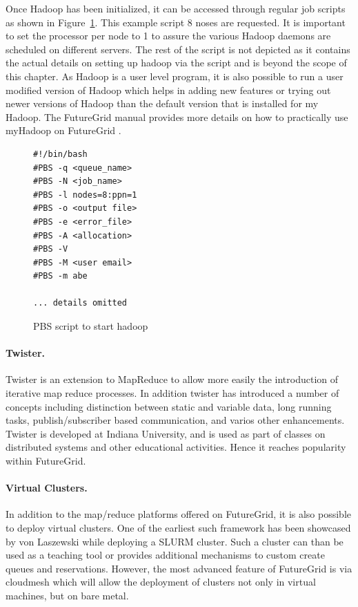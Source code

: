 Once Hadoop has been initialized, it can be accessed through regular
job scripts as shown in Figure~\ref{F:myhadoop-script}. This example
script 8 noses are requested. It is important to set the processor per
node to 1 to assure the various Hadoop daemons are scheduled on
different servers. The rest of the script is not depicted as it
contains the actual details on setting up hadoop via the script and is
beyond the scope of this chapter. As Hadoop is a user level program, it is also
possible to run a user modified version of Hadoop which helps in
adding new features or trying out newer versions of Hadoop than the
default version that is installed for my Hadoop. The FutureGrid manual
provides more details on how to practically use myHadoop on FutureGrid
\cite{fg-manual-hadoop}.

\begin{figure}[htb]
\begin{center}
\begin{verbatim}
#!/bin/bash
#PBS -q <queue_name>
#PBS -N <job_name>
#PBS -l nodes=8:ppn=1
#PBS -o <output file>
#PBS -e <error_file>
#PBS -A <allocation>
#PBS -V
#PBS -M <user email>
#PBS -m abe

... details omitted
\end{verbatim}
\end{center}
\caption{PBS script to start hadoop}\label{F:myhadoop-script}
\end{figure}

\paragraph{Twister.}

Twister is an extension to MapReduce to allow more easily the
introduction of iterative map reduce processes. In addition twister
has introduced a number of concepts including distinction between
static and variable data, long running tasks, publish/subscriber based
communication, and varios other enhancements.  Twister is developed at
Indiana University, and is used as part of classes on distributed
systems and other educational activities. Hence it reaches popularity
within FutureGrid.

\paragraph{Virtual Clusters.} In addition to the map/reduce platforms
offered on FutureGrid, it is also possible to deploy virtual
clusters. One of the earliest such framework has been showcased by von
Laszewski while deploying a SLURM cluster. Such a cluster can than be
used as a teaching tool or provides additional mechanisms to custom
create queues and reservations. However, the most advanced feature of
FutureGrid is via cloudmesh which will allow the deployment of
clusters not only in virtual machines, but on bare metal.
